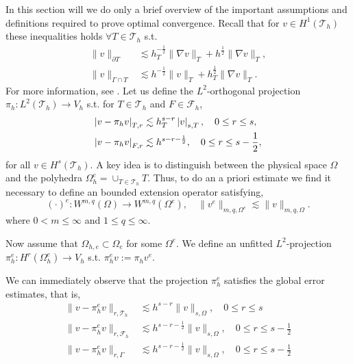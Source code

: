 In this section will we do only a brief overview of the important assumptions and definitions required to prove optimal convergence.
Recall that for $v \in H^{1}( \mathcal{T } _{h}) $ these inequalities holds $\forall T \in \mathcal{T} _{h}$ s.t. \[
\begin{split}
    \| v \|_{ \partial T }^{  } &\lesssim h^{-\frac{1}{2}}_{T}\| \nabla v \|_{ T }^{  }+ h^{\frac{1}{2}} \| \nabla v \|_{T  }^{   }  , \\
    \| v \|_{ \Gamma \cap T }^{  } &\lesssim  h^{-\frac{1}{2}} \| v \|_{T  }^{  }   + h^{\frac{1}{2}}_{T} \| \nabla v \|_{ T }^{  }.
\end{split}
\]
For more information, see \cite{gurkan2019stabilized}. Let us define the $L^2$-orthogonal projection $\pi _{h}: L^2( \mathcal{T} _{h}) \to V_{h}$ s.t. for $T \in \mathcal{T} _{h}$ and $F \in \mathcal{F} _{h}$,
\[
    \begin{split}
\left\lvert  v - \pi _{h} v  \right\rvert _{T,r} & \lesssim h^{s-r}_{T} \left\lvert  v  \right\rvert _{s,T}, \quad 0\le r \le s, \\
\left\lvert  v - \pi _{h}v  \right\rvert _{F,r} & \lesssim  h^{s-r-\frac{1}{2}}, \quad 0\le r \le s -\frac{1}{2},
    \end{split}
\]
for all $v \in H^{s}( \mathcal{T} _{h}) $.
A key idea is to distinguish between the physical space $\Omega $ and the polyhedra $\Omega ^{e}_{h} = \cup _{T\in \mathcal{T} _{h} } T$. Thus, to do an
a priori estimate we find it necessary to define an bounded extension operator satisfying, \[
( \cdot ) ^{e}: W^{m,q}( \Omega )  \to W^{m,q} ( \Omega ^{e}), \quad \| v^{e} \|_{ m,q,\Omega ^{e}  }^{  } \lesssim \| v \|_{ m,q, \Omega  }^{  }.
\]
where $0< m \le \infty$ and $1 \le q \le \infty$.

Now assume that $\Omega _{h,e} \subset  \Omega_{e} $ for some $\Omega^{e}  $. We define an unfitted $L^2$-projection $\pi _{h}^{e}: H^{r}( \Omega ^{e}_{h}) \to V_{h}$
s.t.  $\pi ^{e} _{h} v := \pi _{h} v^{e}$.


We can immediately observe that the projection $\pi _{h}^{e}$ satisfies the global error estimates, that is,
\begin{align}
    \label{eq:projection_estimates_1}
    \| v - \pi _{h}^{e} v \|_{  r, \mathcal{T} _{h} }^{  } & \lesssim h^{s-r} \| v \|_{ s, \Omega }^{  }, \quad 0\le r\le s \\
    \label{eq:projection_estimates_2}
\| v - \pi ^{e}_{h}v \|_{ r,\mathcal{F} _{h} }^{  } & \lesssim h^{s-r-\frac{1}{2}} \| v \|_{ s, \Omega  }^{  }, \quad 0  \le  r \le   s- \frac{1}{2} \\
    \label{eq:projection_estimates_3}
\| v - \pi ^{e}_{h}v \|_{ r, \Gamma }^{  } & \lesssim h^{s-r-\frac{1}{2}} \| v \|_{ s, \Omega  }^{  }, \quad 0  \le  r \le   s- \frac{1}{2}
\end{align}

